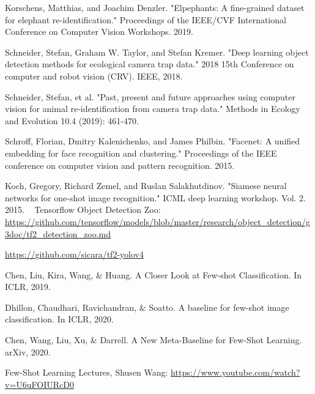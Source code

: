 \documentclass[10pt,twocolumn,letterpaper]{article}
\begin{document}
\begin{thebibliography}{99}
	Korschens, Matthias, and Joachim Denzler. "Elpephants: A fine-grained dataset for elephant re-identification." Proceedings of the IEEE/CVF International Conference on Computer Vision Workshops. 2019. 




	Schneider, Stefan, Graham W. Taylor, and Stefan Kremer. "Deep learning object detection methods for ecological camera trap data." 2018 15th Conference on computer and robot vision (CRV). IEEE, 2018.



	Schneider, Stefan, et al. "Past, present and future approaches using computer vision for animal re‐identification from camera trap data." Methods in Ecology and Evolution 10.4 (2019): 461-470. 

	Schroff, Florian, Dmitry Kalenichenko, and James Philbin. "Facenet: A unified embedding for face recognition and clustering." Proceedings of the IEEE conference on computer vision and pattern recognition. 2015. 


	Koch, Gregory, Richard Zemel, and Ruslan Salakhutdinov. "Siamese neural networks for one-shot image recognition." ICML deep learning workshop. Vol. 2. 2015. 
 
	Tensorflow Object Detection Zoo: \url{https://github.com/tensorflow/models/blob/master/research/object_detection/g3doc/tf2_detection_zoo.md}

	\url{https://github.com/sicara/tf2-yolov4}

	Chen, Liu, Kira, Wang, \& Huang. A Closer Look at Few-shot Classification. In ICLR, 2019.

	Dhillon, Chaudhari, Ravichandran, \& Soatto. A baseline for few-shot image classification. In ICLR, 2020.

	Chen, Wang, Liu, Xu, \& Darrell. A New Meta-Baseline for Few-Shot Learning. arXiv, 2020.

	Few-Shot Learning Lectures, Shusen Wang: \url{https://www.youtube.com/watch?v=U6uFOIURcD0}

\end{thebibliography}
\end{document}
